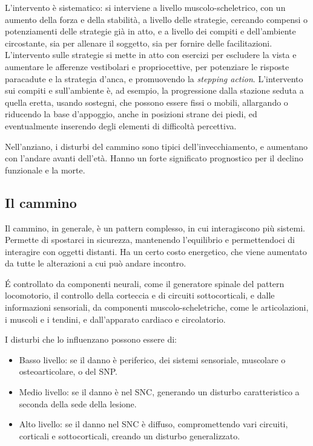 L'intervento è sistematico: si interviene a livello muscolo-scheletrico, con un
aumento della forza e della stabilità, a livello delle strategie, cercando
compensi o potenziamenti delle strategie già in atto, e a livello dei compiti
e dell'ambiente circostante, sia per allenare il soggetto, sia per fornire delle
facilitazioni. L'intervento sulle strategie si mette in atto con esercizi per
escludere la vista e aumentare le afferenze vestibolari e propriocettive, per
potenziare le risposte paracadute e la strategia d'anca, e promuovendo la
\textit{stepping action}. L'intervento sui compiti e sull'ambiente è, ad
esempio, la progressione dalla stazione seduta a quella eretta, usando sostegni,
che possono essere fissi o mobili, allargando o riducendo la base d'appoggio,
anche in posizioni strane dei piedi, ed eventualmente inserendo degli elementi
di difficoltà percettiva.

Nell'anziano, i disturbi del cammino sono tipici dell'invecchiamento, e
aumentano con l'andare avanti dell'età. Hanno un forte significato prognostico
per il declino funzionale e la morte.

\subsection{Il cammino}
Il cammino, in generale, è un pattern complesso, in cui interagiscono più
sistemi. Permette di spostarci in sicurezza, mantenendo l'equilibrio e
permettendoci di interagire con oggetti distanti. Ha un certo costo energetico,
che viene aumentato da tutte le alterazioni a cui può andare incontro.

\'E controllato da componenti neurali, come il generatore spinale del pattern
locomotorio, il controllo della corteccia e di circuiti sottocorticali, e dalle
informazioni sensoriali, da componenti muscolo-scheletriche, come le
articolazioni, i muscoli e i tendini, e dall'apparato cardiaco e circolatorio.

I disturbi che lo influenzano possono essere di:
\begin{itemize}
\item Basso livello: se il danno è periferico, dei sistemi sensoriale, muscolare
o osteoarticolare, o del SNP.
\item Medio livello: se il danno è nel SNC, generando un disturbo caratteristico
a seconda della sede della lesione.
\item Alto livello: se il danno nel SNC è diffuso, compromettendo vari circuiti,
corticali e sottocorticali, creando un disturbo generalizzato.
\end{itemize}


